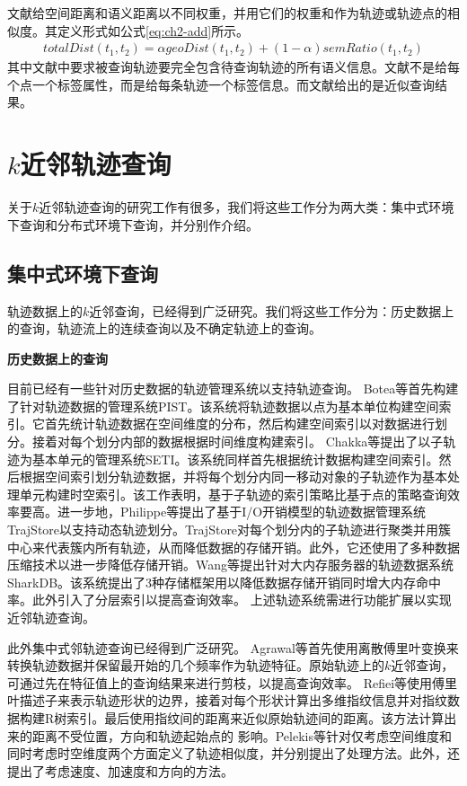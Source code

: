 文献\cite{ZhengYZXSZ15,Kaiser,ShangDYXZK12}给空间距离和语义距离以不同权重，并用它们的权重和作为轨迹或轨迹点的相似度。其定义形式如公式\ref{eq:ch2-add}所示。
\begin{eqnarray}\label{eq:ch2-add}
totalDist(t_{1},t_{2}) = \alpha  geoDist(t_{1},t_{2}) + (1-\alpha)  semRatio(t_{1},t_{2})
\end{eqnarray}
其中文献\cite{Kaiser}中要求被查询轨迹要完全包含待查询轨迹的所有语义信息。文献\cite{ShangDYXZK12}不是给每个点一个标签属性，而是给每条轨迹一个标签信息。而文献\cite{ZhengYZXSZ15}给出的是近似查询结果。

\section{$k$近邻轨迹查询}\label{sec-c2-topk}
关于$k$近邻轨迹查询的研究工作有很多，我们将这些工作分为两大类：集中式环境下查询和分布式环境下查询，并分别作介绍。

\subsection{集中式环境下查询}
轨迹数据上的$k$近邻查询，已经得到广泛研究。我们将这些工作分为：历史数据上的查询，轨迹流上的连续查询以及不确定轨迹上的查询。

\textbf{历史数据上的查询}

目前已经有一些针对历史数据的轨迹管理系统以支持轨迹查询\cite{BoteaMNS08,ChakkaEP03,Cudre-MaurouxWM10}。
Botea等\cite{BoteaMNS08}首先构建了针对轨迹数据的管理系统PIST。该系统将轨迹数据以点为基本单位构建空间索引。它首先统计轨迹数据在空间维度的分布，然后构建空间索引以对数据进行划分。接着对每个划分内部的数据根据时间维度构建索引。
Chakka等\cite{ChakkaEP03}提出了以子轨迹为基本单元的管理系统SETI。该系统同样首先根据统计数据构建空间索引。然后根据空间索引划分轨迹数据，并将每个划分内同一移动对象的子轨迹作为基本处理单元构建时空索引。该工作表明，基于子轨迹的索引策略比基于点的策略查询效率要高。进一步地，Philippe等\cite{Cudre-MaurouxWM10}提出了基于I/O开销模型的轨迹数据管理系统TrajStore以支持动态轨迹划分。TrajStore对每个划分内的子轨迹进行聚类并用簇中心来代表簇内所有轨迹，从而降低数据的存储开销。此外，它还使用了多种数据压缩技术以进一步降低存储开销。Wang等提出针对大内存服务器的轨迹数据系统SharkDB\cite{WangZZS15,WangZXZZS14,ZhengWZSLS18}。该系统提出了3种存储框架用以降低数据存储开销同时增大内存命中率。此外引入了分层索引以提高查询效率。
上述轨迹系统需进行功能扩展以实现近邻轨迹查询。

此外集中式邻轨迹查询已经得到广泛研究。
Agrawal等\cite{AgrawalFS93}首先使用离散傅里叶变换来转换轨迹数据并保留最开始的几个频率作为轨迹特征。原始轨迹上的$k$近邻查询，可通过先在特征值上的查询结果来进行剪枝，以提高查询效率。
Refiei等\cite{RafieiM02}使用傅里叶描述子来表示轨迹形状的边界，接着对每个形状计算出多维指纹信息并对指纹数据构建R树索引。最后使用指纹间的距离来近似原始轨迹间的距离。该方法计算出来的距离不受位置，方向和轨迹起始点的 影响。Pelekis等\cite{Pelekis}针对仅考虑空间维度和同时考虑时空维度两个方面定义了轨迹相似度，并分别提出了处理方法。此外，还提出了考虑速度、加速度和方向的方法。

